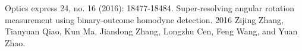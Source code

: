 \begin{cventries}
  \cventry
    {Optics express 24, no. 16 (2016): 18477-18484.}
    {Super-resolving angular rotation measurement using binary-outcome homodyne detection.}
    {} %
    {2016} %
    {Zijing Zhang, Tianyuan Qiao, Kun Ma, Jiandong Zhang, {\setmainfont{SourceSansPro-Bold}Longzhu Cen}, Feng Wang, and Yuan Zhao.}

\end{cventries}